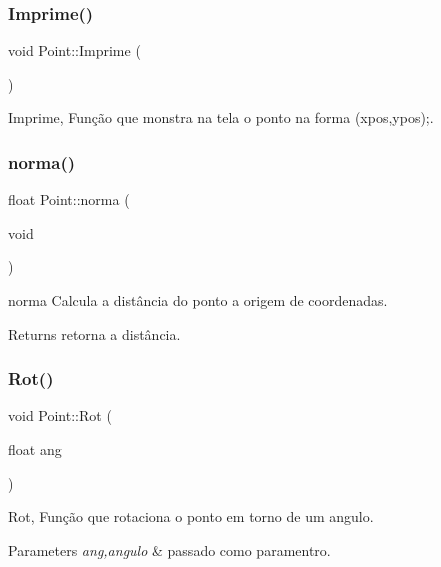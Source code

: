 \subsubsection{\texorpdfstring{Imprime()}{Imprime()}}
{\footnotesize\ttfamily void Point\+::\+Imprime (\begin{DoxyParamCaption}{ }\end{DoxyParamCaption})}



Imprime, Função que monstra na tela o ponto na forma (xpos,ypos);. 

\mbox{\label{class_point_aa3005a9d97e2cb05624414973a214788}} 
\subsubsection{\texorpdfstring{norma()}{norma()}}
{\footnotesize\ttfamily float Point\+::norma (\begin{DoxyParamCaption}\item[{void}]{ }\end{DoxyParamCaption})}



norma Calcula a distância do ponto a origem de coordenadas. 

\begin{DoxyReturn}{Returns}
retorna a distância. 
\end{DoxyReturn}
\mbox{\label{class_point_a5d756c4b1cf7aeeb49ac79ff8cd3d1e9}} 
\subsubsection{\texorpdfstring{Rot()}{Rot()}}
{\footnotesize\ttfamily void Point\+::\+Rot (\begin{DoxyParamCaption}\item[{float}]{ang }\end{DoxyParamCaption})}



Rot, Função que rotaciona o ponto em torno de um angulo. 


\begin{DoxyParams}{Parameters}
{\em ang,angulo} & passado como paramentro. \\
\hline
\end{DoxyParams}
\mbox{\label{class_point_acee4acaa1d515e9973145f977e500fe6}} 
